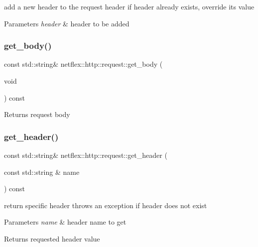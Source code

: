 add a new header to the request header if header already exists, override its value


\begin{DoxyParams}{Parameters}
{\em header} & header to be added \\
\hline
\end{DoxyParams}
\mbox{\label{classnetflex_1_1http_1_1request_a87b3e0c5dc64ea8b4e7dda4e81254fbe}} 
\subsubsection{\texorpdfstring{get\+\_\+body()}{get\_body()}}
{\footnotesize\ttfamily const std\+::string\& netflex\+::http\+::request\+::get\+\_\+body (\begin{DoxyParamCaption}\item[{void}]{ }\end{DoxyParamCaption}) const}

\begin{DoxyReturn}{Returns}
request body 
\end{DoxyReturn}
\mbox{\label{classnetflex_1_1http_1_1request_a5d94ca7f1b6ce44a27c655570f2b8899}} 
\subsubsection{\texorpdfstring{get\+\_\+header()}{get\_header()}}
{\footnotesize\ttfamily const std\+::string\& netflex\+::http\+::request\+::get\+\_\+header (\begin{DoxyParamCaption}\item[{const std\+::string \&}]{name }\end{DoxyParamCaption}) const}

return specific header throws an exception if header does not exist


\begin{DoxyParams}{Parameters}
{\em name} & header name to get \\
\hline
\end{DoxyParams}
\begin{DoxyReturn}{Returns}
requested header value 
\end{DoxyReturn}
\mbox{\label{classnetflex_1_1http_1_1request_a20a9b71acd61945261bbeaf81a73caf8}} 
